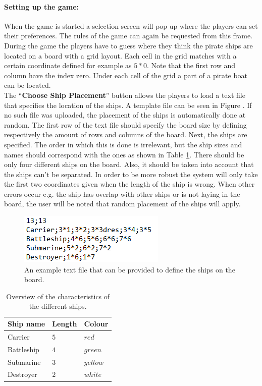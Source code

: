\documentclass[a4paper,10pt]{article}
\begin{document}
\paragraph{Setting up the game:}
When the game is started a selection screen will pop up where the players can set their preferences. The rules of the game can again be requested from this frame. During the game the players have to guess where they think the pirate ships are located on a board with a grid layout. Each cell in the grid matches with a certain coordinate defined for example as $ 5*0 $. Note that the first row and column have the index zero. Under each cell of the grid a part of a pirate boat can be located.\\
The ``\textbf{Choose Ship Placement}'' button allows the players to load a text file that specifies the location of the ships. A template file can be seen in Figure \label{f:template}. If no such file was uploaded, the placement of the ships is automatically done at random. The first row of the text file should specify the board size by defining respectively the amount of rows and columns of the board. Next, the ships are specified. The order in which this is done is irrelevant, but the ship sizes and names should correspond with the ones as shown in Table \ref{t:layoutTextFile}. There should be only four different ships on the board. Also, it should be taken into account that the ships can't be separated. In order to be more robust the system will only take the first two coordinates given when the length of the ship is wrong. When other errors occur e.g. the ship has overlap with other ships or is not laying in the board, the user will be noted that random placement of the ships will apply.\\

\begin{figure}[h!]
	\begin{center}
		\includegraphics[]{template.PNG}
	\end{center}	
	\caption{An example text file that can be provided to define the ships on the board.}
	\label{f:template}
\end{figure}


\begin{table}[h!]
	\centering
	\begin{tabular}{|p{3cm}|p{2cm}|p{2cm}|}
		\hline
		\textbf{Ship name} & \textbf{Length} & \textbf{Colour}\\ \hline
		Carrier  & $ 5 $ & $ red $\\ \hline
		Battleship  & $ 4 $ & $ green $\\ \hline
		Submarine  & $ 3 $ & $ yellow $\\ \hline
		Destroyer  & $ 2 $ & $ white $\\ \hline
	\end{tabular}
	\caption{Overview of the characteristics of the different ships.}
	\label{t:layoutTextFile}
\end{table}
\end{document}
